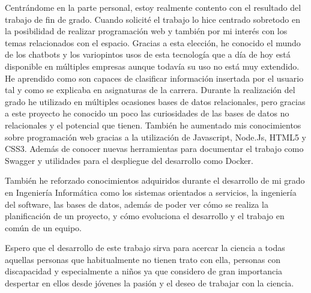 Centrándome en la parte personal, estoy realmente contento con el resultado del trabajo de fin de grado. Cuando solicité el trabajo lo hice centrado sobretodo en la posibilidad de realizar programación web y también por mi interés con los temas relacionados con el espacio. 
Gracias a esta elección, he conocido el mundo de los chatbots y los variopintos usos de esta tecnología que a día de hoy está disponible en múltiples empresas aunque todavía su uso no está muy extendido. He aprendido como son capaces de clasificar información insertada por el usuario tal y como se explicaba en asignaturas de la carrera. Durante la realización del grado he utilizado en múltiples ocasiones bases de datos relacionales, pero gracias a este proyecto he conocido un poco las curiosidades de las bases de datos no relacionales y el potencial que tienen. 
También he aumentado mis conocimientos sobre programación web gracias a la utilización de Javascript, Node.Js, HTML5 y CSS3. Además de conocer nuevas herramientas para documentar el trabajo como Swagger y utilidades para el despliegue del desarrollo como Docker.

También he reforzado conocimientos adquiridos durante el desarrollo de mi grado en Ingeniería Informática como los sistemas orientados a servicios, la ingeniería del software, las bases de datos, además de poder ver cómo se realiza la planificación de un proyecto, y cómo evoluciona el desarrollo y el trabajo en común de un equipo.

Espero que el desarrollo de este trabajo sirva para acercar la ciencia a todas aquellas personas que habitualmente no tienen trato con ella, personas con discapacidad y especialmente a niños ya que considero de gran importancia despertar en ellos desde jóvenes la pasión y el deseo de trabajar con la ciencia.